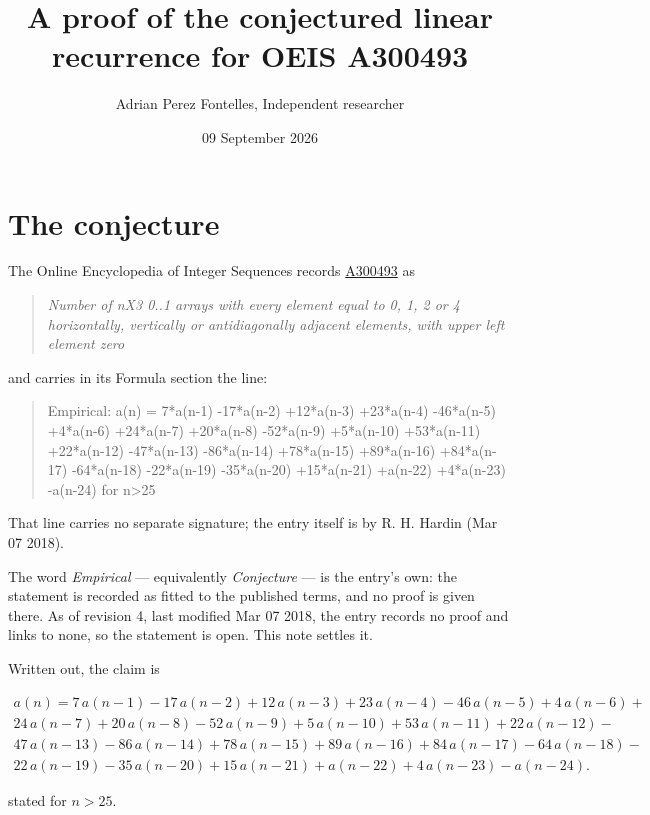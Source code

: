 \documentclass[11pt]{article}
\title{A proof of the conjectured linear recurrence for OEIS A300493}
\author{Adrian Perez Fontelles, Independent researcher}
\date{09 September 2026}
\theoremstyle{definition}
\begin{document}
\maketitle
\section{The conjecture}

The Online Encyclopedia of Integer Sequences records \href{https://oeis.org/A300493}{A300493} as

\begin{quote}\itshape Number of nX3 0..1 arrays with every element equal to 0, 1, 2 or 4 horizontally, vertically or antidiagonally adjacent elements, with upper left element zero\end{quote}

and carries in its Formula section the line:

\begin{quote}\ttfamily Empirical: a(n) = 7*a(n-1) -17*a(n-2) +12*a(n-3) +23*a(n-4) -46*a(n-5) +4*a(n-6) +24*a(n-7) +20*a(n-8) -52*a(n-9) +5*a(n-10) +53*a(n-11) +22*a(n-12) -47*a(n-13) -86*a(n-14) +78*a(n-15) +89*a(n-16) +84*a(n-17) -64*a(n-18) -22*a(n-19) -35*a(n-20) +15*a(n-21) +a(n-22) +4*a(n-23) -a(n-24) for n>25\end{quote}

That line carries no separate signature; the entry itself is by R. H. Hardin (Mar 07 2018).

The word {\itshape Empirical} --- equivalently {\itshape Conjecture} --- is the entry's own: the statement is recorded as fitted to the published terms, and no proof is given there. As of revision 4, last modified Mar 07 2018, the entry records no proof and links to none, so the statement is open. This note settles it.

Written out, the claim is

\begin{multline*} a(n) = 7\,a(n-1) - 17\,a(n-2) + 12\,a(n-3) + 23\,a(n-4) - 46\,a(n-5) + 4\,a(n-6) + \\ 24\,a(n-7) + 20\,a(n-8) - 52\,a(n-9) + 5\,a(n-10) + 53\,a(n-11) + 22\,a(n-12) - \\ 47\,a(n-13) - 86\,a(n-14) + 78\,a(n-15) + 89\,a(n-16) + 84\,a(n-17) - 64\,a(n-18) - \\ 22\,a(n-19) - 35\,a(n-20) + 15\,a(n-21) + a(n-22) + 4\,a(n-23) - a(n-24). \end{multline*}

stated for $n > 25$.
\end{document}
